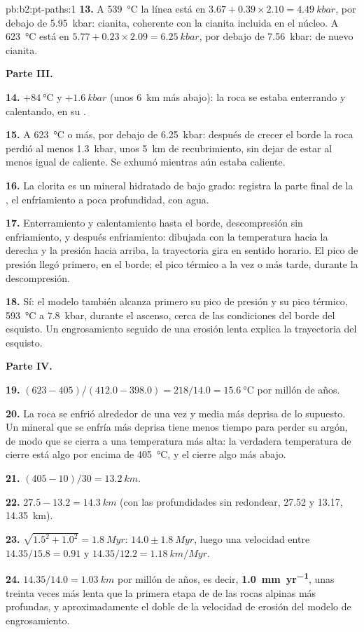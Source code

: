 \begin{solution}{pb:b2:pt-paths:1}
\textbf{13.} A \qty{539}{\celsius} la línea está en $3.67 + 0.39\times2.10 =
\qty{4.49}{kbar}$, por debajo de \qty{5.95}{kbar}: cianita, coherente con la cianita incluida
en el núcleo. A \qty{623}{\celsius} está en $5.77 + 0.23\times2.09 = \qty{6.25}{kbar}$,
por debajo de \qty{7.56}{kbar}: de nuevo cianita.

\noindent\textbf{Parte III.}

\textbf{14.} $+\qty{84}{\celsius}$ y $+\qty{1.6}{kbar}$ (unos \qty{6}{km} más abajo): la
roca se estaba enterrando y calentando, en su .

\textbf{15.} A \qty{623}{\celsius} o más, por debajo de \qty{6.25}{kbar}: después de crecer el borde la
roca perdió al menos \qty{1.3}{kbar}, unos \qty{5}{km} de recubrimiento, sin dejar de estar
al menos igual de caliente. Se exhumó mientras aún estaba caliente.

\textbf{16.} La clorita es un mineral hidratado de bajo grado: registra la parte final de la , el enfriamiento a poca profundidad, con agua.

\textbf{17.} Enterramiento y calentamiento hasta el borde, descompresión sin enfriamiento, y después enfriamiento:
dibujada con la temperatura hacia la derecha y la presión hacia arriba, la trayectoria gira en sentido horario. El
pico de presión llegó primero, en el borde; el pico térmico a la vez o más tarde, durante la
descompresión.

\textbf{18.} Sí: el modelo también alcanza primero su pico de presión y su pico térmico,
\qty{593}{\celsius} a \qty{7.8}{kbar}, durante el ascenso, cerca de las condiciones del borde
del esquisto. Un engrosamiento seguido de una erosión lenta explica la trayectoria del esquisto.

\noindent\textbf{Parte IV.}

\textbf{19.} $(623 - 405)/(412.0 - 398.0) = 218/14.0 = \qty{15.6}{\celsius}$ por millón
de años.

\textbf{20.} La roca se enfrió alrededor de una vez y media más deprisa de lo supuesto. Un mineral
que se enfría más deprisa tiene menos tiempo para perder su argón, de modo que se cierra a una temperatura más alta:
la verdadera temperatura de cierre está algo por encima de \qty{405}{\celsius}, y el cierre
algo más abajo.

\textbf{21.} $(405 - 10)/30 = \qty{13.2}{km}$.

\textbf{22.} $27.5 - 13.2 = \qty{14.3}{km}$ (con las profundidades sin redondear, 27.52 y 13.17,
\qty{14.35}{km}).

\textbf{23.} $\sqrt{1.5^2 + 1.0^2} = \qty{1.8}{Myr}$: $14.0 \pm \qty{1.8}{Myr}$, luego una velocidad
entre $14.35/15.8 = 0.91$ y $14.35/12.2 = \qty{1.18}{km/Myr}$.

\textbf{24.} $14.35/14.0 = \qty{1.03}{km}$ por millón de años, es decir,
\textbf{\qty[text-series-to-math=true]{1.0}{mm.yr^{-1}}}, unas treinta veces más lenta que
la primera etapa de  de las rocas alpinas más profundas, y aproximadamente el doble de la velocidad de erosión
del modelo de engrosamiento.
\end{solution}
